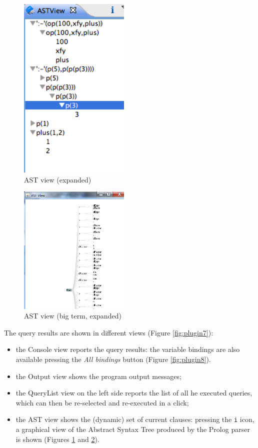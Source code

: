 \begin{figure}
  \includegraphics[width=200px]{images/plugin9.png}
  \caption{AST view (expanded)}\label{fig:plugin9}
\end{figure}

\begin{figure}
  \includegraphics[width=200px]{images/plugin10.png}
  \caption{AST view (big term, expanded)}\label{fig:plugin10}
\end{figure}

The query results are shown in different views (Figure \ref{fig:plugin7}):
\begin{itemize}
  \item the \tuprolog{} Console view reports the query results: the variable bindings are also available pressing the \textit{All bindings} button (Figure \ref{fig:plugin8}).
  \item the Output view shows the program output messages;
  \item the QueryList view on the left side reports the list of all he executed queries, which can then be re-selected and re-executed in a click;
  \item the AST view shows the (dynamic) set of current clauses: pressing the \texttt{i} icon, a graphical view of the Abstract Syntax Tree produced by the Prolog parser is shown (Figures \ref{fig:plugin9} and \ref{fig:plugin10}).
\end{itemize}

